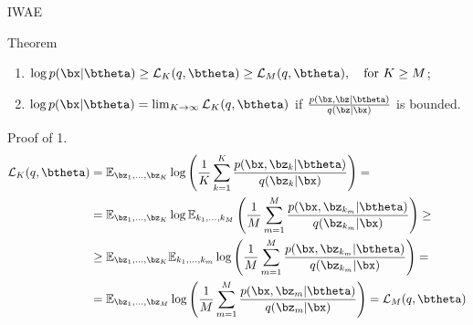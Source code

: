 \begin{frame}{IWAE}
	\begin{block}{Theorem}
		\begin{enumerate}
			\item $\log p(\bx | \btheta) \geq \mathcal{L}_K (q, \btheta) \geq \mathcal{L}_M (q, \btheta), \quad \text{for } K \geq M$;
			\item $\log p(\bx | \btheta) = \lim_{K \rightarrow \infty} \mathcal{L}_K (q, \btheta)$ if $\frac{p(\bx, \bz | \btheta)}{q(\bz | \bx)}$ is bounded.
		\end{enumerate}
		\vspace{-0.2cm}
	\end{block}
	\begin{block}{Proof of 1.}
		{ \footnotesize
			\vspace{-0.5cm}
			\begin{align*}
				\mathcal{L}_K (q, \btheta) &= \mathbb{E}_{\bz_1, \dots, \bz_K} \log \left( \frac{1}{K}\sum_{k=1}^K\frac{p(\bx, \bz_k | \btheta)}{q(\bz_k| \bx)} \right) = \\
				&= \mathbb{E}_{\bz_1, \dots, \bz_K} \log \mathbb{E}_{k_1, \dots, k_M} \left( \frac{1}{M}\sum_{m=1}^M\frac{p(\bx, \bz_{k_m} | \btheta)}{q(\bz_{k_m}| \bx)} \right) \geq \\
				&\geq \mathbb{E}_{\bz_1, \dots, \bz_K} \mathbb{E}_{k_1, \dots, k_m} \log \left( \frac{1}{M}\sum_{m=1}^M\frac{p(\bx, \bz_{k_m} | \btheta)}{q(\bz_{k_m}| \bx)} \right) = \\
				&= \mathbb{E}_{\bz_1, \dots, \bz_M} \log \left( \frac{1}{M}\sum_{m=1}^M\frac{p(\bx, \bz_m | \btheta)}{q(\bz_m| \bx)} \right) = \mathcal{L}_M (q, \btheta)
			\end{align*}
		}
	\end{block}
	
\end{frame}
